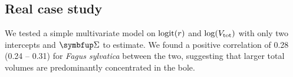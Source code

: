\subsection{Real case study}

We tested a simple multivariate model on \( \operatorname{logit}(r) \) and \( \log(V_{\text{tot}}) \) with only two intercepts and \( \Sigmabf \) to estimate. We found a positive correlation of 0.28 (0.24 -- 0.31) for \textit{Fagus sylvatica} between the two, suggesting that larger total volumes are predominantly concentrated in the bole.
